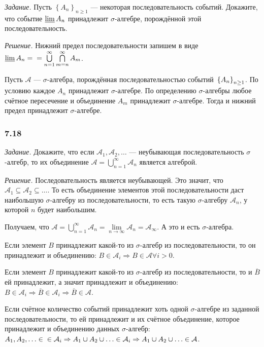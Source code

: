 \textit{Задание.} Пусть $ \left\{ A_n \right\}_{n \geq 1}$ --- некоторая последовательность событий.
Докажите, что событие $ \varliminf A_n$ принадлежит $ \sigma $-алгебре, порождённой этой последовательность.

\textit{Решение.} Нижний предел последовательности запишем в виде $ \varliminf A_n = \\
= \bigcup \limits_{n=1}^{ \infty } \bigcap \limits_{m=n}^{ \infty } A_m$.

Пусть $ \mathcal{A}$ --- $ \sigma $-алгебра, порождённая последовательностью событий $ \\
\left\{ A_n \right\}_{n \geq 1}$.
По условию каждое $A_n$ принадлежит $ \sigma $-алгебре.
По определению $ \sigma $-алгебры любое счётное пересечение и объединение $A_m$ принадлежит $ \sigma $-алгебре.
Тогда и нижний предел принадлежит $ \sigma $-алгебре.

\subsubsection*{7.18}

\textit{Задание.}
Докажите, что если $ \mathcal{A}_1, \mathcal{A}_2, \dotsc $ ---
неубывающая последовательность $ \sigma $-алгебр, то их объединение $ \mathcal{A} = \bigcup \limits_{n=1}^{ \infty } \mathcal{A}_n$ является алгеброй.

\textit{Решение.} Последовательность является неубывающей.
Это значит, что $ \mathcal{A}_1 \subseteq \mathcal{A}_2 \subseteq \dotsc $.
То есть объединение элементов этой последовательности даст наибольшую $ \sigma $-алгебру из последовательности, то есть такую $ \sigma $-алгебру $ \mathcal{A}_n$, у которой $n$ будет наибольшим.

Получаем,
что
$ \mathcal{A} =
\bigcup \limits_{n=1}^{ \infty } \mathcal{A}_n =
\lim \limits_{n \rightarrow \infty } \mathcal{A}_n =
\mathcal{A}_{ \infty}$.
А это и есть $ \sigma $-алгебра.

Если элемент $B$ принадлежит какой-то из $ \sigma $-алгебр из последовательности,
то он принадлежит и объединению: $B \in \mathcal{A}_i \Rightarrow B \in \mathcal{A} \forall i > 0$.

Если элемент $B$ принадлежит какой-то из $ \sigma $-алгебр из последовательности,
то и $ \overline{B} $ ей принадлежит, а значит принадлежит и объединению:
$B \in \mathcal{A}_i \Rightarrow
\overline{B} \in \mathcal{A}_i \Rightarrow
\overline{B} \in \mathcal{A} $.

Если счётное количество событий принадлежит хоть одной $ \sigma $-алгебре из заданной последовательности,
то ей принадлежит и их счётное объединение, которое принадлежит и объединению данных $ \sigma $-алгебр:
$A_1, A_2, \dotsc \in \\
\in \mathcal{A}_i \Rightarrow
A_1 \cup A_2 \cup \dotsc \in \mathcal{A}_i \Rightarrow
A_1 \cup A_2 \cup \dotsc \in \mathcal{A} $.

